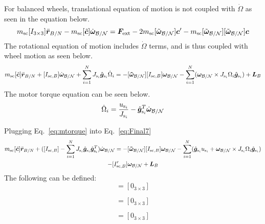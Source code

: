 For balanced wheels, translational equation of motion is not coupled with $\dot{\Omega}$ as seen in the equation below.
\begin{equation}
m_{\text{sc}} [I_{3 \times 3}]\ddot{\bm r}_{B/N}
-m_{\text{sc}} [\tilde{\bm{c}}] \dot{\bm\omega}_{\cal B/N} 
= \bm F_{\text{ext}}- 2 m_{\text{sc}} [\tilde{\bm\omega}_{\cal B/N}] \bm c'
-m_{\text{sc}} [\tilde{\bm\omega}_{\cal B/N}][\tilde{\bm\omega}_{\cal B/N}]\bm{c}
\label{eq:Rbddot35}
\end{equation}
The rotational equation of motion includes $\dot{\Omega}$ terms, and is thus coupled with wheel motion as seen below.
\begin{multline}
m_{\text{sc}}[\tilde{\bm{c}}] \ddot{\bm r}_{B/N}
+[I_{\text{sc},B}] \dot{\bm\omega}_{\cal B/N}
+\sum_{i=1}^{N}J_{\text{s}_i} \hat{\bm g}_{\text{s}_i}\dot{\Omega}_i
= -[\bm{\tilde{\omega}}_{\cal B/N}] [I_{\text{sc},B}] \bm\omega_{\cal B/N} - \sum_{i=1}^{N}(\bm\omega_{\cal B/N}\times J_{\text{s}_i}\Omega_i\hat{\bm g}_{\text{s}_i})
+ \bm{L}_B
\label{eq:Final7}
\end{multline}
The motor torque equation can be seen below.
\begin{equation}
\dot{\Omega}_i = \frac{u_{\text{s}_i}}{J_{\text{s}_i}}-\hat{\bm g}_{\text{s}_i}^T \dot{\bm{\omega}}_{\cal B/N}
\label{eq:mtorque}
\end{equation}

Plugging Eq.~\eqref{eq:mtorque} into Eq.~\eqref{eq:Final7}
\begin{multline}
m_{\text{sc}}[\tilde{\bm{c}}] \ddot{\bm r}_{B/N}
+([I_{\text{sc},B}]-\sum_{i=1}^{N}J_{\text{s}_i} \hat{\bm g}_{\text{s}_i} \hat{\bm g}_{\text{s}_i}^T) \dot{\bm\omega}_{\cal B/N}
= -[\bm{\tilde{\omega}}_{\cal B/N}] [I_{\text{sc},B}] \bm\omega_{\cal B/N} - \sum_{i=1}^{N}(\hat{\bm g}_{\text{s}_i} u_{\text{s}_i} + \bm\omega_{\cal B/N}\times J_{\text{s}_i}\Omega_i\hat{\bm g}_{\text{s}_i})
\\- [I'_{\text{sc},B}] \bm\omega_{\cal B/N}
+ \bm{L}_B
\label{eq:Final72}
\end{multline}
The following can be defined:
\begin{equation}
[A_\text{contr}] = [0_{3 \times 3}]
\end{equation}

\begin{equation}
[B_\text{contr}] = [0_{3 \times 3}]
\end{equation}

\begin{equation}
[C_\text{contr}] = [0_{3 \times 3}]
\end{equation}

